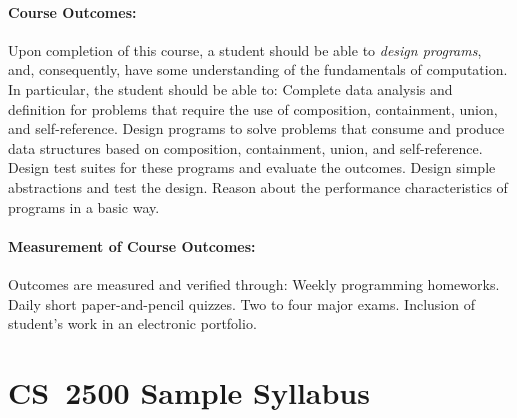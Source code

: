 \documentclass[11pt]{article}
\begin{document}
\paragraph{Course Outcomes:}
%
Upon completion of this course, a student should be able to \emph{design programs},
and, consequently, have some understanding of the fundamentals of computation.
In particular, the student should be able to: Complete data analysis and
definition for problems that require the use of composition, containment,
union, and self-reference. Design programs to solve problems that consume and
produce data structures based on composition, containment, union, and
self-reference. Design test suites for these programs and evaluate the
outcomes. Design simple abstractions and test the design. Reason about the
performance characteristics of programs in a basic way.

\paragraph{Measurement of Course Outcomes:}
%
Outcomes are measured and verified through: Weekly programming homeworks.
Daily short paper-and-pencil quizzes. Two to four major exams. Inclusion of
student's work in an electronic portfolio.

\pagebreak

\section{CS~2500 Sample Syllabus}
\end{document}

